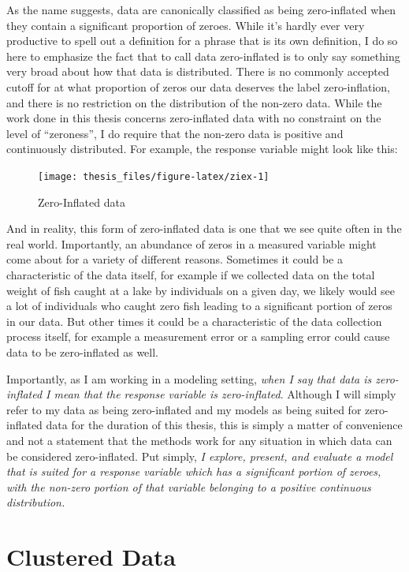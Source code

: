 \documentclass[12pt,twoside]{reedthesis}
\begin{document}
As the name suggests, data are canonically classified as being zero-inflated when they contain a significant proportion of zeroes. While it's hardly ever very productive to spell out a definition for a phrase that is its own definition, I do so here to emphasize the fact that to call data zero-inflated is to only say something very broad about how that data is distributed. There is no commonly accepted cutoff for at what proportion of zeros our data deserves the label zero-inflation, and there is no restriction on the distribution of the non-zero data. While the work done in this thesis concerns zero-inflated data with no constraint on the level of ``zeroness'', I do require that the non-zero data is positive and continuously distributed. For example, the response variable might look like this:
\begin{figure}

{\centering \texttt{[image: thesis\_files/figure-latex/ziex-1]} 

}

\caption{Zero-Inflated data}\label{fig:ziex}
\end{figure}
And in reality, this form of zero-inflated data is one that we see quite often in the real world. Importantly, an abundance of zeros in a measured variable might come about for a variety of different reasons. Sometimes it could be a characteristic of the data itself, for example if we collected data on the total weight of fish caught at a lake by individuals on a given day, we likely would see a lot of individuals who caught zero fish leading to a significant portion of zeros in our data. But other times it could be a characteristic of the data collection process itself, for example a measurement error or a sampling error could cause data to be zero-inflated as well.

Importantly, as I am working in a modeling setting, \emph{when I say that data is zero-inflated I mean that the response variable is zero-inflated}. Although I will simply refer to my data as being zero-inflated and my models as being suited for zero-inflated data for the duration of this thesis, this is simply a matter of convenience and not a statement that the methods work for any situation in which data can be considered zero-inflated. Put simply, \emph{I explore, present, and evaluate a model that is suited for a response variable which has a significant portion of zeroes, with the non-zero portion of that variable belonging to a positive continuous distribution.}

\hypertarget{clustered-data}{%
\section{Clustered Data}\label{clustered-data}}
\end{document}
